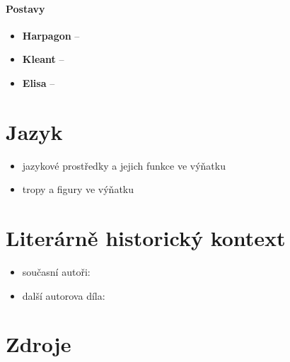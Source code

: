 \documentclass[10pt,a4paper]{article}
\begin{document}
\paragraph{Postavy}
\begin{itemize}
\item \textbf{Harpagon} --
\item \textbf{Kleant} --
\item \textbf{Elisa} --
\end{itemize}
\section*{Jazyk}
\begin{itemize}
\item jazykové prostředky a jejich funkce ve výňatku
\item tropy a figury ve výňatku
\end{itemize}
\section*{Literárně historický kontext}
\begin{itemize}
\item současní autoři:
\item další autorova díla:
\end{itemize}
\section*{Zdroje}
\end{document}

